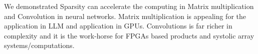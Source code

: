 \documentclass[conference]{IEEEtran}
\begin{document}
We demonstrated Sparsity can accelerate the computing in Matrix
multiplication and Convolution in neural networks.  Matrix
multiplication is appealing for the application in LLM and application
in GPUs. Convolutions is far richer in complexity and it is the
work-horse for FPGAs based products and systolic array
systems/computations.










\end{document}
